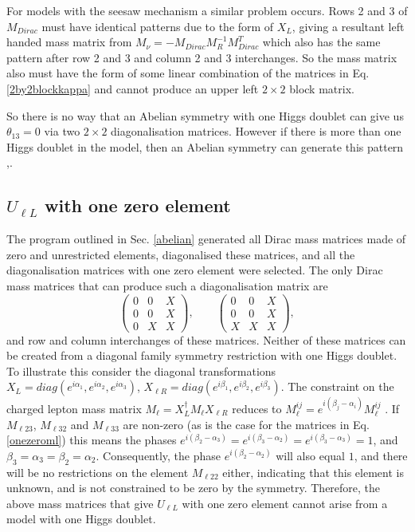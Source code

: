 \documentclass[nofootinbib,showpacs]{revtex4}
\begin{document}
For models with the seesaw mechanism a similar problem occurs. Rows 2 and 3 of $M_{Dirac}$ must have identical patterns due to the form of $X_L$, 
 giving a resultant left handed mass matrix from $M_\nu=-M_{Dirac} M_R^{-1} M_{Dirac}^T$ which also has the same pattern after row 2 and 3 and column 2 and 3 interchanges. So the mass matrix also must have the form of some linear combination of the matrices in Eq. \ref{2by2blockkappa} and cannot produce an upper left $2\times 2$ block matrix. 

So there is no way that an Abelian symmetry with one Higgs doublet can give us $\theta_{13}=0$ via two $2\times 2$ diagonalisation matrices.
However if there is more than one Higgs doublet in the model, then an Abelian symmetry can generate this pattern \cite{nogo2},\cite{matheta13}. 

\subsection{$U_{\ell L}$ with one zero element} 

The program outlined in Sec. \ref{abelian} generated all Dirac mass matrices made of zero and unrestricted elements, diagonalised these matrices, and all the diagonalisation matrices with one zero element were selected. The only Dirac mass matrices that can produce such a diagonalisation matrix are
\begin{equation}\label{onezeroml}
\left(\begin{array}{ccc}0&0&X\\0&0&X\\0&X&X\end{array}\right),\qquad \left(\begin{array}{ccc}0&0&X\\0&0&X\\X&X&X\end{array}\right),
\end{equation}
and row and column interchanges of these matrices. Neither of these matrices can be created from a diagonal family symmetry restriction with one Higgs doublet. To illustrate this consider the diagonal transformations $X_L=diag(e^{i\alpha_1},e^{i \alpha_2}, e^{i\alpha_3})$, $X_{\ell R}=diag(e^{i\beta_1},e^{i \beta_2}, e^{i\beta_3})$.  The constraint on the charged lepton mass matrix $M_\ell = X_L^\dagger M_\ell X_{\ell R}$ reduces to $M^{ij}_\ell =  e^{i (\beta_j-\alpha_i)} M^{ij}_\ell$ . If $M_{\ell 23}$, $M_{\ell 32}$ and $M_{\ell 33}$ are non-zero (as is the case for the matrices in Eq. \ref{onezeroml}) this means the phases $e^{i (\beta_2-\alpha_3)}=e^{i (\beta_3-\alpha_2)}=e^{i (\beta_3-\alpha_3)}=1$, and $\beta_3=\alpha_3=\beta_2=\alpha_2$. Consequently, the phase $e^{i (\beta_2-\alpha_2)}$ will also equal $1$, and there will be no restrictions on the element $M_{\ell 22}$ either, indicating that this element is unknown, and is not constrained to be zero by the symmetry.
Therefore, the above mass matrices that give $U_{\ell L}$ with one zero element cannot arise from a model with one Higgs doublet. 
\end{document}
